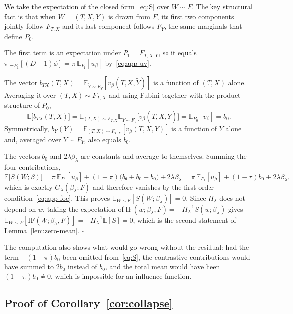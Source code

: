 \documentclass[11pt]{article}
\theoremstyle{plain}
\theoremstyle{definition}
\theoremstyle{remark}
\newcommand{\pE}{\ensuremath{\mathbb{E}}}
\newcommand{\ratio}{\ensuremath{\pi}}
\newcommand{\IF}{\mathrm{IF}}
\newcommand{\score}{S}
\begin{document}
We take the expectation of the closed form~\eqref{eq:S} over $W \sim F$. The key structural
fact is that when $W = (T,X,Y)$ is drawn from $F$, its first two components jointly follow
$F_{T,X}$ and its last component follows $F_Y$, the same marginals that define $P_0$.

The first term is an expectation under $P_1 = F_{T,X,Y}$, so it equals
$\ratio\,\pE_{P_1}[(D-1)\phi] = \ratio\,\pE_{P_1}[u_\beta]$ by~\eqref{eq:app-uv}.

The vector $b_{TX}(T,X) = \pE_{\widetilde Y \sim F_Y}[v_\beta(T,X,\widetilde Y)]$ is a function
of $(T,X)$ alone. Averaging it over $(T,X) \sim F_{T,X}$ and using Fubini together with the
product structure of $P_0$,
\[
\pE\big[ b_{TX}(T,X) \big]
= \pE_{(T,X) \sim F_{T,X}} \pE_{\widetilde Y \sim F_Y}\big[ v_\beta(T,X,\widetilde Y) \big]
= \pE_{P_0}[v_\beta] = b_0 .
\]
Symmetrically, $b_Y(Y) = \pE_{(T,X) \sim F_{T,X}}[v_\beta(T,X,Y)]$ is a function of $Y$ alone
and, averaged over $Y \sim F_Y$, also equals $b_0$.

The vectors $b_0$ and $2\lambda\beta_\lambda$ are constants and average to themselves. Summing
the four contributions,
\[
\pE\big[ \score(W;\beta) \big]
= \ratio\,\pE_{P_1}[u_\beta] + (1-\ratio)\big( b_0 + b_0 - b_0 \big) + 2\lambda\beta_\lambda
= \ratio\,\pE_{P_1}[u_\beta] + (1-\ratio)b_0 + 2\lambda\beta_\lambda,
\]
which is exactly $G_\lambda(\beta_\lambda;F)$ and therefore vanishes by the first-order
condition~\eqref{eq:app-foc}. This proves $\pE_{W\sim F}[\score(W;\beta_\lambda)] = 0$. Since
$H_\lambda$ does not depend on $w$, taking the expectation of
$\IF(w;\beta_\lambda,F) = -H_\lambda^{-1}\score(w;\beta_\lambda)$ gives
$\pE_{W\sim F}[\IF(W;\beta_\lambda,F)] = -H_\lambda^{-1}\pE[\score] = 0$, which is the second
statement of Lemma~\ref{lem:zero-mean}. \hfill$\square$

The computation also shows what would go wrong without the residual: had the term
$-(1-\ratio)b_0$ been omitted from~\eqref{eq:S}, the contrastive contributions would have summed
to $2b_0$ instead of $b_0$, and the total mean would have been $(1-\ratio)b_0 \neq 0$, which is
impossible for an influence function.

\subsection{Proof of Corollary~\ref{cor:collapse}}
\label{app:logistic-collapse}
\end{document}
